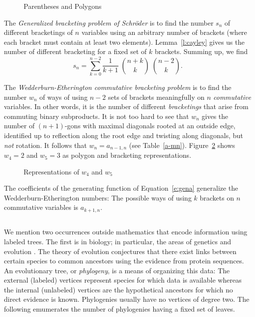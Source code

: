 \documentclass[10pt]{amsart}
\begin{document}
\begin{figure}[h]
\caption{Parentheses and Polygons}
\label{k4}
\end{figure}

The {\em Generalized bracketing problem of Schr\"oder} is to find the number $s_n$ of different bracketings of $n$ variables using an arbitrary number of brackets (where each bracket must contain at least two elements).  Lemma~\ref{l:cayley} gives us the number of different bracketing for a fixed set of $k$ brackets.  Summing up, we find
$$s_n = \sum_{k=0}^{n-2} \frac{1}{k+1} \; \binom{n+k}{k} \; \binom{n-2}{k}.$$

The {\em Wedderburn-Etherington commutative bracketing problem} is to find the number $w_n$ of ways of using $n-2$ sets of brackets meaningfully on $n$ {\em commutative} variables. In other words, it is the number of different {\em bracketings} that arise from commuting binary subproducts. It is not too hard to see that $w_n$ gives the number of $(n+1)$-gons with maximal diagonals rooted at an outside edge, identified up to reflection along the root edge and twisting along diagonals, but {\em not} rotation.  It follows that $w_n = a_{n-1, n}$ (see Table~\ref{a-mn}).  Figure~\ref{f:wedder} shows $w_4 = 2$ and $w_5 = 3$ as polygon and bracketing representations.

\begin{figure}[h]
\caption{Representations of $w_4$ and $w_5$}
\label{f:wedder}
\end{figure}

\begin{rem}
The coefficients of the generating function of Equation~\ref{e:gena} generalize the Wedderburn-Etherington numbers:  The possible ways of using $k$ brackets on $n$ commutative variables is $a_{k+1, n}$.
\end{rem}


\subsection{}

We mention two occurrences outside mathematics that encode information using labeled trees.  The first is in biology; in particular, the areas of genetics and evolution \cite{ph}.  The theory of evolution conjectures that there exist links between certain species to common ancestors using the evidence from protein sequences.  An evolutionary tree, or {\em phylogeny}, is a means of organizing this data: The external (labeled) vertices represent species for which data is available whereas the internal (unlabeled) vertices are the hypothetical ancestors for which no direct evidence is known.  Phylogenies usually have no vertices of degree two.  The following emumerates the number of phylogenies having a fixed set of leaves.
\end{document}
